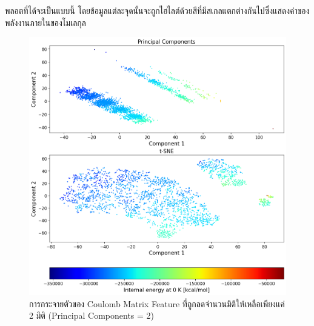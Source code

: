 \noindent พลอตที่ได้จะเป็นแบบนี้ โดยข้อมูลแต่ละจุดนั้นจะถูกไฮไลต์ด้วยสีที่มีสเกลแตกต่างกันไปซึ่งแสดงค่าของพลังงานภายในของโมเลกุล

\begin{figure}[htbp]
    \centering
    \includegraphics[width=\linewidth]{fig/cm_pca_tsne.png}
    \caption{การกระจายตัวของ Coulomb Matrix Feature ที่ถูกลดจำนวนมิติให้เหลือเพียงแค่ 2 มิติ (Principal Components = 2)}
    \label{fig:cm_pca_tsne}
\end{figure}
